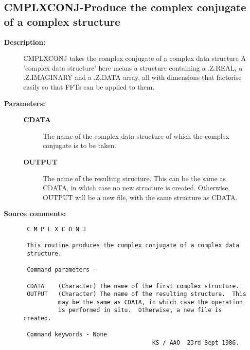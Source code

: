 \subsection{CMPLXCONJ-\label{CMPLXCONJ}Produce the complex conjugate of a complex structure}
\begin{description}

\item [{\bf Description:}]
 CMPLXCONJ takes the complex conjugate of a complex data structure
 A 'complex data structure' here means a structure containing a
 .Z.REAL, a .Z.IMAGINARY and a .Z.DATA array, all with dimensions
 that factorise easily so that FFTs can be applied to them.

\item [{\bf Parameters:}]
\begin{description}
\item [{\bf CDATA}]
 The name of the complex data structure of which
 the complex conjugate is to be taken.
\item [{\bf OUTPUT}]
 The name of the resulting structure. This can
 be the same as CDATA, in which case no new structure is
 created.  Otherwise, OUTPUT will be a new file, with the
 same structure as CDATA.
\end{description}

\item [{\bf Source comments:}]
\begin{verbatim}
 C M P L X C O N J

 This routine produces the complex conjugate of a complex data
 structure.

 Command parameters -

 CDATA    (Character) The name of the first complex structure.
 OUTPUT   (Character) The name of the resulting structure.  This
          may be the same as CDATA, in which case the operation
          is performed in situ.  Otherwise, a new file is created.

 Command keywords - None
                                     KS / AAO  23rd Sept 1986.
\end{verbatim}
\end{description}
